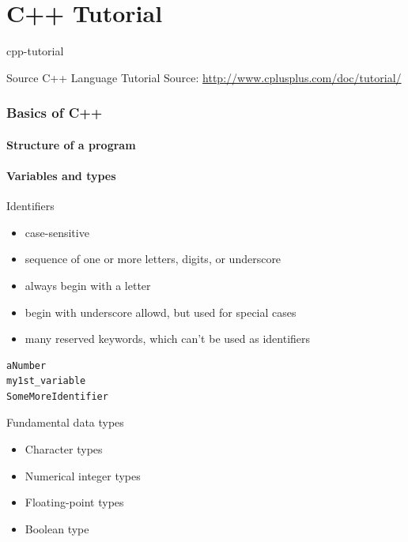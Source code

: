 \documentclass{beamer}
\begin{document}
\part{C++ Tutorial}{cpp-tutorial}

\begin{frame}{Source}
C++ Language Tutorial
Source: \url{http://www.cplusplus.com/doc/tutorial/}
\end{frame}

\section{Basics of C++}

\subsection{Structure of a program}
\begin{frame}

\end{frame}

\subsection{Variables and types}
\begin{frame}

\end{frame}


\begin{frame}[fragile]{Identifiers}
\begin{itemize}
  \item case-sensitive
  \item sequence of one or more letters, digits, or underscore
  \item always begin with a letter
  \item begin with underscore allowd, but used for special cases
  \item many reserved keywords, which can't be used as identifiers 
\end{itemize}
\begin{lstlisting}[caption=Identifiers Examples]
aNumber
my1st_variable
SomeMoreIdentifier
\end{lstlisting}
\end{frame}

\begin{frame}{Fundamental data types}
\begin{itemize}
  \item Character types
  \item Numerical integer types
  \item Floating-point types
  \item Boolean type
\end{itemize}
\end{frame}
\end{document}
